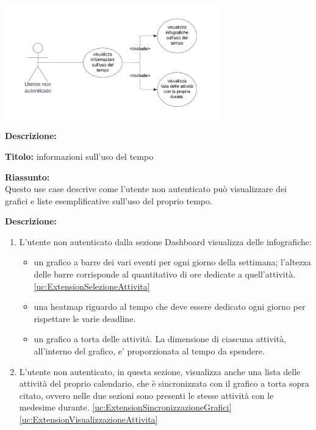 \begin{listaPersonale}[UC]{}
    \begin{center}
        \includegraphics[width=0.7\textwidth]{img/Diagrammi/UseCases/UsoDelTempo.png}
    \end{center}

    \textbf{Descrizione:}

    \textbf{Titolo:} informazioni sull'uso del tempo

    \textbf{Riassunto:} \\
    Questo use case descrive come l'utente non autenticato può visualizzare dei grafici e liste esemplificative sull'uso del proprio tempo.

    \textbf{Descrizione:}
    \begin{enumerate}
        \item L'utente non autenticato dalla sezione Dashboard visualizza delle infografiche:
              \begin{itemize}
                  \item un grafico a barre dei vari eventi per ogni giorno della settimana; l'altezza delle barre corrisponde al quantitativo di ore dedicate a quell'attività. \ref{uc:ExtensionSelezioneAttivita}
                  \item una heatmap riguardo al tempo che deve essere dedicato ogni giorno per rispettare le varie deadline.
                  \item un grafico a torta delle attività. La dimensione di ciascuna attività, all'interno del grafico, e' proporzionata al tempo da spendere.
              \end{itemize}
        \item L'utente non autenticato, in questa sezione, visualizza anche una lista delle attività del proprio calendario, che è sincronizzata con il grafico a torta sopra citato, ovvero nelle due sezioni sono presenti le stesse attività con le medesime durante. \ref{uc:ExtensionSincronizzazioneGrafici} \ref{uc:ExtensionVisualizzazioneAttivita}
    \end{enumerate}


\end{listaPersonale}

